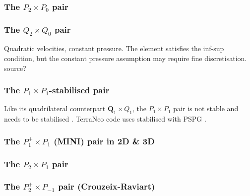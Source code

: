 \subsubsection{The ${ P}_2\times P_0$ pair} \label{ss:p2p0}


\subsubsection{The ${ Q}_2\times Q_0$ pair} \label{ss:pairq2q0}

Quadratic velocities, constant pressure. The element satisfies the inf-sup condition, 
but the constant pressure assumption may require fine discretisation.
source?


\subsubsection{The ${ P}_1\times P_1$-stabilised pair} \label{ss:P1P1stab}

Like its quadrilateral counterpart ${\bm Q}_1\times Q_1$, the 
$P_1\times P_1$ pair is not stable and needs to be stabilised \cite{nosi98,tasu00}.
TerraNeo code uses stabilised with PSPG \cite{babd20}.

\textcite{nosi98}

\subsubsection{The ${ P}_1^+\times P_1$ (MINI) pair in 2D \& 3D \label{pair:mini}}


\subsubsection{The ${ P}_2\times P_1$ pair \label{ss:p2p1}}


\subsubsection{The ${ P}_2^+\times P_{-1}$ pair  (Crouzeix-Raviart) }
\label{sec:crouzeix-raviart}


